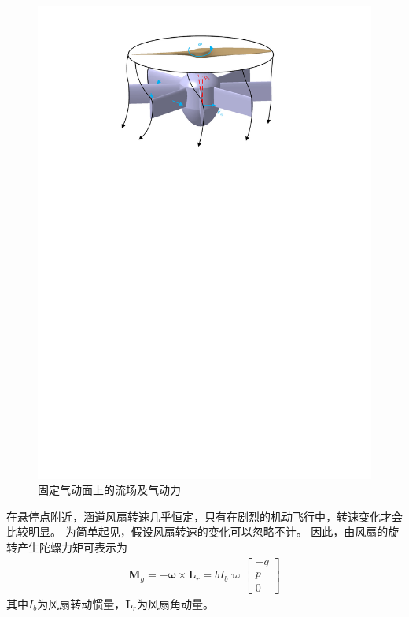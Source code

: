 \begin{figure}[htbp]
	\centering
	\includegraphics[scale=1]{Fig/F_af1.pdf}
	\caption{\label{F_af}固定气动面上的流场及气动力}
\end{figure}

在悬停点附近，涵道风扇转速几乎恒定，只有在剧烈的机动飞行中，转速变化才会比较明显。 为简单起见，假设风扇转速的变化可以忽略不计。 因此，由风扇的旋转产生陀螺力矩可表示为
\begin{align}
\bm{M}_{{g}}=-\bm{\omega} \times \bm{L}_{{r}}=b I_{b} \varpi
\begin{bmatrix}
-q \\
p \\
0
\end{bmatrix}
\end{align}
其中$ I_{b} $为风扇转动惯量，$ \bm{L}_{{r}} $为风扇角动量。
